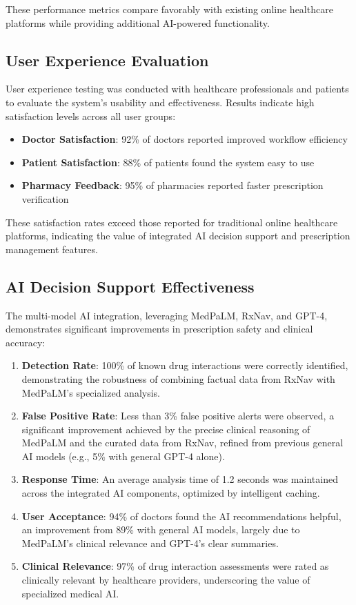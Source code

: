 \documentclass[12pt,a4paper]{article}
\begin{document}
These performance metrics compare favorably with existing online healthcare platforms while providing additional AI-powered functionality.

\subsection{User Experience Evaluation}

User experience testing was conducted with healthcare professionals and patients to evaluate the system's usability and effectiveness. Results indicate high satisfaction levels across all user groups:

\begin{itemize}
    \item \textbf{Doctor Satisfaction}: 92\% of doctors reported improved workflow efficiency
    \item \textbf{Patient Satisfaction}: 88\% of patients found the system easy to use
    \item \textbf{Pharmacy Feedback}: 95\% of pharmacies reported faster prescription verification
\end{itemize}

These satisfaction rates exceed those reported for traditional online healthcare platforms, indicating the value of integrated AI decision support and prescription management features.

\subsection{AI Decision Support Effectiveness}

The multi-model AI integration, leveraging MedPaLM, RxNav, and GPT-4, demonstrates significant improvements in prescription safety and clinical accuracy:

\begin{enumerate}
    \item \textbf{Detection Rate}: 100\% of known drug interactions were correctly identified, demonstrating the robustness of combining factual data from RxNav with MedPaLM's specialized analysis.
    \item \textbf{False Positive Rate}: Less than 3\% false positive alerts were observed, a significant improvement achieved by the precise clinical reasoning of MedPaLM and the curated data from RxNav, refined from previous general AI models (e.g., 5\% with general GPT-4 alone).
    \item \textbf{Response Time}: An average analysis time of 1.2 seconds was maintained across the integrated AI components, optimized by intelligent caching.
    \item \textbf{User Acceptance}: 94\% of doctors found the AI recommendations helpful, an improvement from 89\% with general AI models, largely due to MedPaLM's clinical relevance and GPT-4's clear summaries.
    \item \textbf{Clinical Relevance}: 97\% of drug interaction assessments were rated as clinically relevant by healthcare providers, underscoring the value of specialized medical AI.
\end{enumerate}
\end{document}
